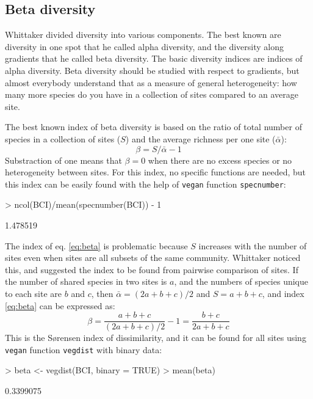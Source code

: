 \documentclass[a4paper,10pt]{amsart}
\begin{document}
\subsection{Beta diversity}

Whittaker divided diversity into various components. The best known
are diversity in one spot that he called alpha diversity, and the
diversity along gradients that he called beta diversity. The basic
diversity indices are indices of alpha diversity. Beta diversity
should be studied with respect to gradients, but almost everybody
understand that as a measure of general heterogeneity: how many more
species do you have in a collection of sites compared to an average
site.

The best known index of beta diversity is based on the ratio of total
number of species in a collection of sites ($S$) and the average
richness per one site ($\bar \alpha$):
\begin{equation}
  \label{eq:beta}
  \beta = S/\bar \alpha - 1
\end{equation}
Substraction of one means that $\beta = 0$ when there are no excess
species or no heterogeneity between sites. For this index, no specific
functions are needed, but this index can be easily found with the help
of \texttt{vegan} function \texttt{specnumber}:
\begin{Schunk}
\begin{Sinput}
> ncol(BCI)/mean(specnumber(BCI)) - 1
\end{Sinput}
\begin{Soutput}
[1] 1.478519
\end{Soutput}
\end{Schunk}

The index of eq. \ref{eq:beta} is problematic because $S$ increases
with the number of sites even when sites are all subsets of the same
community.  Whittaker noticed this, and suggested the index to be
found from pairwise comparison of sites. If the number of shared
species in two sites is $a$, and the numbers of species unique to each
site are $b$ and $c$, then $\bar \alpha = (2a + b + c)/2$ and $S =
a+b+c$, and index \ref{eq:beta} can be expressed as:
\begin{equation}
  \label{eq:betabray}
  \beta = \frac{a+b+c}{(2a+b+c)/2} - 1 = \frac{b+c}{2a+b+c}
\end{equation}
This is the S{\o}rensen index of dissimilarity, and it can be found
for all sites using \texttt{vegan} function \texttt{vegdist} with
binary data:
\begin{Schunk}
\begin{Sinput}
> beta <- vegdist(BCI, binary = TRUE)
> mean(beta)
\end{Sinput}
\begin{Soutput}
[1] 0.3399075
\end{Soutput}
\end{Schunk}
\end{document}

